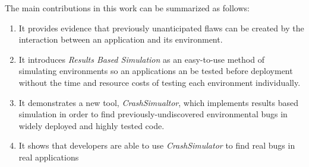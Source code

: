 The main contributions in this work can be summarized as follows:

\begin{enumerate}

\item{It provides evidence
that previously unanticipated flaws can be created by the interaction
between an application and its environment.}

\item{It introduces \textit{Results Based Simulation}
as an easy-to-use method of simulating environments
so an applications an be tested before deployment
without the time and resource costs of
testing each environment individually.}

\item{It demonstrates a new tool, {\em CrashSimualtor},
which implements results based simulation
in order to find previously-undiscovered environmental bugs
in widely deployed and highly tested code.}

\item{It shows that developers are able
to use {\em CrashSimulator}
to find real bugs in real applications}

\end{enumerate}
